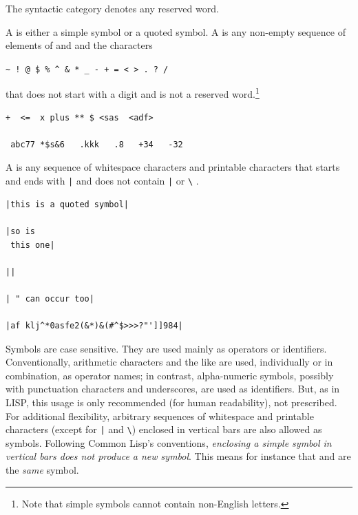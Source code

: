 \begin{description}
The syntactic category  denotes any reserved word.

\item[Symbols.]
A  is either a simple symbol or a quoted symbol.
A  is any non-empty sequence of elements of  and 
 and the characters
\begin{center}
\verb|~ ! @ $ % ^ & * _ - + = < > . ? /|
\end{center}
that does not start with a digit and is not a reserved word.\footnote{%
Note that simple symbols cannot contain non-English letters.
}

\begin{lstlisting}[linewidth=25.5em]
 +  <=  x plus ** $ <sas  <adf> 
 
 abc77 *$s&6   .kkk   .8   +34   -32 
\end{lstlisting}

A  is any sequence of whitespace characters and printable characters
that starts and ends with \verb+|+ and does not contain \verb+|+ or \verb+\+ .
\smallskip

\begin{lstlisting}[linewidth=25.5em]
|this is a quoted symbol|

|so is 
 this one|

||

| " can occur too|

|af klj^*0asfe2(&*)&(#^$>>>?"']]984|
\end{lstlisting}

Symbols are case sensitive.
They are used mainly as operators or identifiers.
Conventionally, arithmetic characters and the like are used, 
individually or in combination, as operator names;
in contrast, alpha-numeric symbols, possibly with punctuation characters and underscores, are used as identifiers.
But, as in LISP, this usage is only recommended (for human readability),
not prescribed.
For additional flexibility, arbitrary sequences of whitespace and printable characters 
(except for \verb+|+ and \verb+\+)
enclosed in vertical bars are also allowed as symbols.
Following Common Lisp's conventions, 
\emph{enclosing a simple symbol in vertical bars does not produce a new symbol}.
This means for instance that  and  are the \emph{same} symbol.


\end{description}
